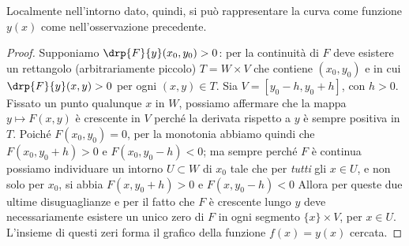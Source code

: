 Localmente nell'intorno dato, quindi, si può rappresentare la curva come funzione $y(x)$ come nell'osservazione precedente.
\begin{proof}
	Supponiamo $\drp{F}{y}(x_0,y_0)>0$: per la continuità di $F$ deve esistere un rettangolo (arbitrariamente piccolo) $T=W\times V$ che contiene $(x_0,y_0)$ e in cui $\drp{F}{y}(x,y)>0$ per ogni $(x,y)\in T$.
	Sia $V=[y_0-h,y_0+h]$, con $h>0$. Fissato un punto qualunque $x$ in $W$, possiamo affermare che la mappa $y\mapsto F(x,y)$ è crescente in $V$ perché la derivata rispetto a $y$ è sempre positiva in $T$.
	Poich\'e $F(x_0,y_0)=0$, per la monotonia abbiamo quindi che $F(x_0,y_0+h)>0$ e $F(x_0,y_0-h)<0$; ma sempre perché $F$ è continua possiamo individuare un intorno $U\subset W$ di $x_0$ tale che per \emph{tutti} gli $x\in U$, e non solo per $x_0$, si abbia $F(x,y_0+h)>0$ e $F(x,y_0-h)<0$
	Allora per queste due ultime disuguaglianze e per il fatto che $F$ è crescente lungo $y$ deve necessariamente esistere un unico zero di $F$ in ogni segmento $\{x\}\times V$, per $x\in U$.
	L'insieme di questi zeri forma il grafico della funzione $f(x)=y(x)$ cercata.


\end{proof}
